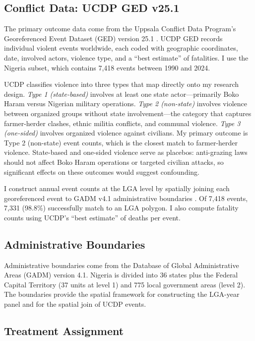 \documentclass[12pt]{article}
\begin{document}
\subsection{Conflict Data: UCDP GED v25.1}

The primary outcome data come from the Uppsala Conflict Data Program's Georeferenced Event Dataset (GED) version 25.1 \citep{sundberg2013introducing, pettersson2023organized}. UCDP GED records individual violent events worldwide, each coded with geographic coordinates, date, involved actors, violence type, and a ``best estimate'' of fatalities. I use the Nigeria subset, which contains 7,418 events between 1990 and 2024.

UCDP classifies violence into three types that map directly onto my research design. \textit{Type 1 (state-based)} involves at least one state actor---primarily Boko Haram versus Nigerian military operations. \textit{Type 2 (non-state)} involves violence between organized groups without state involvement---the category that captures farmer-herder clashes, ethnic militia conflicts, and communal violence. \textit{Type 3 (one-sided)} involves organized violence against civilians. My primary outcome is Type 2 (non-state) event counts, which is the closest match to farmer-herder violence. State-based and one-sided violence serve as placebos: anti-grazing laws should not affect Boko Haram operations or targeted civilian attacks, so significant effects on these outcomes would suggest confounding.

I construct annual event counts at the LGA level by spatially joining each georeferenced event to GADM v4.1 administrative boundaries \citep{gadm2024}. Of 7,418 events, 7,331 (98.8\%) successfully match to an LGA polygon. I also compute fatality counts using UCDP's ``best estimate'' of deaths per event.

\subsection{Administrative Boundaries}

Administrative boundaries come from the Database of Global Administrative Areas (GADM) version 4.1. Nigeria is divided into 36 states plus the Federal Capital Territory (37 units at level 1) and 775 local government areas (level 2). The boundaries provide the spatial framework for constructing the LGA-year panel and for the spatial join of UCDP events.

\subsection{Treatment Assignment}
\end{document}
